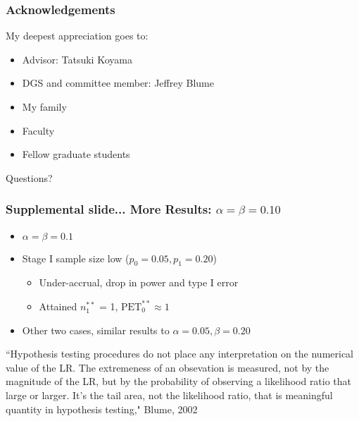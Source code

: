 \documentclass{beamer}\usepackage[]{graphicx}\usepackage[]{color}
\begin{document}
\begin{frame}
\frametitle{Acknowledgements}
My deepest appreciation goes to:
    \begin{itemize}
        \item Advisor: Tatsuki Koyama
        \item DGS and committee member: Jeffrey Blume
        \item My family
        \item Faculty
        \item Fellow graduate students
    \end{itemize}
\end{frame}

\begin{frame}
\centering
\Large
  Questions?
\end{frame}

\begin{frame}
\frametitle{Supplemental slide... More Results: $\alpha = \beta = 0.10$}
    \begin{itemize}
        \item $\alpha = \beta = 0.1$
        \item Stage I sample size low ($p_0 = 0.05, p_1 = 0.20$)
          \begin{itemize}
            \item Under-accrual, drop in power and type I error
            \item Attained $n_1^{\ast\ast}$ = 1, $\mbox{PET}_0^{\ast\ast} \approx 1$ %
          \end{itemize}
        \item Other two cases, similar results to $\alpha = 0.05, \beta = 0.20$
    \end{itemize}
\end{frame}

\begin{frame}
 ``Hypothesis testing procedures do not place any interpretation on the numerical value of the LR. The extremeness of an obsevation is measured, not by the magnitude of the LR, but by the probability of observing a likelihood ratio that large or larger. It's the tail area, not the likelihood ratio, that is meaningful quantity in hypothesis testing," Blume, 2002
\end{frame}
\end{document}

